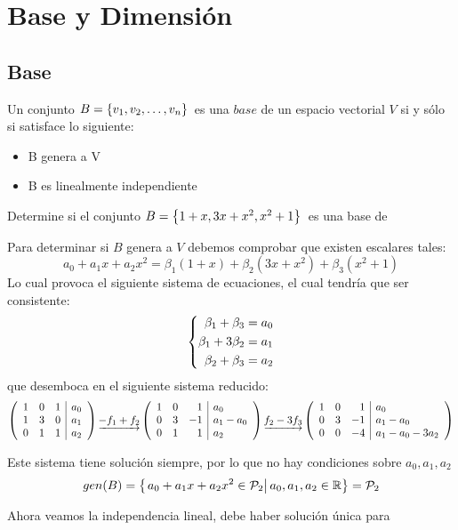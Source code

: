 \chapter{Base y Dimensión}

\section{Base}
\begin{dfn}[Base]
Un conjunto $B= \lbrace v_1, v_2, \ldots, v_n \rbrace$\ es una $base$ de un espacio vectorial $V$ si y s\'olo si satisface lo siguiente:
\begin{itemize}
\item B genera a V
\item B es linealmente independiente
\end{itemize}

\end{dfn}

\begin{ejemplo}
Determine si el conjunto $B= \left\{
1+x, 3x+x^2, x^2+1
 \right\} $\ es una base de \pdos
\end{ejemplo}
\sol
Para determinar si $B$ genera a $V$ debemos comprobar que existen escalares tales:~\\

\[a_0+a_1 x+a_2 x^2=
\beta_1(1+x)+
\beta_2(3x+x^2)+
\beta_3(x^2+1)
\]
Lo cual provoca el siguiente sistema de ecuaciones, el cual tendría que ser consistente:
$$\left\lbrace \begin{aligned} \beta_1 + \beta_3 = a_0\\\beta_1 + 3\beta_2 = a_1\\\beta_2 + \beta_3 = a_2 \end{aligned}\right. $$
que desemboca en el siguiente sistema reducido:
$$\reducir{{rrr|l}}{1&0&1&a_0\\1&3&0&a_1\\0&1&1&a_2}
\underrightarrow{-f_1+f_2}
\reducir{rrr|l}{1&0&1&a_0\\0&3&-1&a_1-a_0\\0&1&1&a_2}
\underrightarrow{f_2 - 3f_3}
\reducir{rrr|l}{1&0&1&a_0\\0&3&-1&a_1-a_0\\0&0&-4&a_1-a_0-3a_2}$$

Este sistema tiene solución siempre, por lo que no hay condiciones sobre $a_0, a_1, a_2$
\[gen(B)=
\left\{ \left. a_0+a_1 x+a_2 x^2 \in \mathcal{P}_2\right| 
a_0, a_1, a_2 \in \mathbb{R}
 \right\}=\mathcal{P}_2
\]

Ahora veamos la independencia lineal, debe haber solución única para

